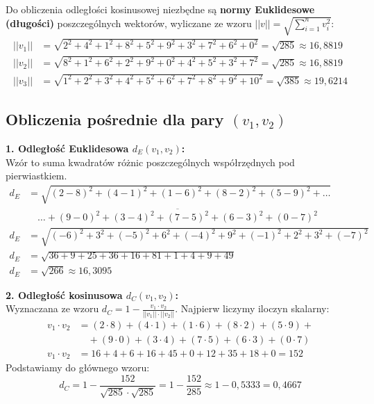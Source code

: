 \documentclass[12pt,a4paper]{article}
\begin{document}
Do obliczenia odległości kosinusowej niezbędne są \textbf{normy Euklidesowe (długości)} poszczególnych wektorów, wyliczane ze wzoru $||v|| = \sqrt{\sum_{i=1}^{n} v_i^2}$:
\begin{align*}
||v_1|| &= \sqrt{2^2 + 4^2 + 1^2 + 8^2 + 5^2 + 9^2 + 3^2 + 7^2 + 6^2 + 0^2} = \sqrt{285} \approx 16,8819 \\
||v_2|| &= \sqrt{8^2 + 1^2 + 6^2 + 2^2 + 9^2 + 0^2 + 4^2 + 5^2 + 3^2 + 7^2} = \sqrt{285} \approx 16,8819 \\
||v_3|| &= \sqrt{1^2 + 2^2 + 3^2 + 4^2 + 5^2 + 6^2 + 7^2 + 8^2 + 9^2 + 10^2} = \sqrt{385} \approx 19,6214
\end{align*}

\subsection{Obliczenia pośrednie dla pary $(v_1, v_2)$}

\textbf{1. Odległość Euklidesowa $d_E(v_1, v_2)$:} \\
Wzór to suma kwadratów różnic poszczególnych współrzędnych pod pierwiastkiem.
\begin{align*}
d_E &= \sqrt{(2-8)^2 + (4-1)^2 + (1-6)^2 + (8-2)^2 + (5-9)^2 + \dots} \\
&\quad \overline{\dots + (9-0)^2 + (3-4)^2 + (7-5)^2 + (6-3)^2 + (0-7)^2} \\
d_E &= \sqrt{(-6)^2 + 3^2 + (-5)^2 + 6^2 + (-4)^2 + 9^2 + (-1)^2 + 2^2 + 3^2 + (-7)^2} \\
d_E &= \sqrt{36 + 9 + 25 + 36 + 16 + 81 + 1 + 4 + 9 + 49} \\
d_E &= \sqrt{266} \approx 16,3095
\end{align*}

\textbf{2. Odległość kosinusowa $d_C(v_1, v_2)$:} \\
Wyznaczana ze wzoru $d_C = 1 - \frac{v_1 \cdot v_2}{||v_1|| \cdot ||v_2||}$. Najpierw liczymy iloczyn skalarny:
\begin{align*}
v_1 \cdot v_2 &= (2\cdot8) + (4\cdot1) + (1\cdot6) + (8\cdot2) + (5\cdot9) + \\
&\quad + (9\cdot0) + (3\cdot4) + (7\cdot5) + (6\cdot3) + (0\cdot7) \\
v_1 \cdot v_2 &= 16 + 4 + 6 + 16 + 45 + 0 + 12 + 35 + 18 + 0 = 152
\end{align*}
Podstawiamy do głównego wzoru:
\begin{equation}
d_C = 1 - \frac{152}{\sqrt{285} \cdot \sqrt{285}} = 1 - \frac{152}{285} \approx 1 - 0,5333 = 0,4667
\end{equation}
\end{document}
